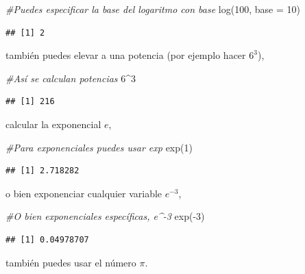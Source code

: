 \documentclass[]{tufte-book}
\newenvironment{Shaded}{}{}
\newcommand{\AttributeTok}[1]{\textcolor[rgb]{0.49,0.56,0.16}{#1}}
\newcommand{\CommentTok}[1]{\textcolor[rgb]{0.38,0.63,0.69}{\textit{#1}}}
\newcommand{\DecValTok}[1]{\textcolor[rgb]{0.25,0.63,0.44}{#1}}
\newcommand{\FunctionTok}[1]{\textcolor[rgb]{0.02,0.16,0.49}{#1}}
\newcommand{\NormalTok}[1]{#1}
\newcommand{\SpecialCharTok}[1]{\textcolor[rgb]{0.25,0.44,0.63}{#1}}
\begin{document}
\begin{Shaded}
\begin{Highlighting}[]
\CommentTok{\#Puedes especificar la base del logaritmo con base }
\FunctionTok{log}\NormalTok{(}\DecValTok{100}\NormalTok{, }\AttributeTok{base =} \DecValTok{10}\NormalTok{)}
\end{Highlighting}
\end{Shaded}

\begin{verbatim}
## [1] 2
\end{verbatim}

también puedes elevar a una potencia (por ejemplo hacer \(6^3\)),

\begin{Shaded}
\begin{Highlighting}[]
\CommentTok{\#Así se calculan potencias}
\DecValTok{6}\SpecialCharTok{\^{}}\DecValTok{3}
\end{Highlighting}
\end{Shaded}

\begin{verbatim}
## [1] 216
\end{verbatim}

calcular la exponencial \(e\),

\begin{Shaded}
\begin{Highlighting}[]
\CommentTok{\#Para exponenciales puedes usar exp}
\FunctionTok{exp}\NormalTok{(}\DecValTok{1}\NormalTok{)}
\end{Highlighting}
\end{Shaded}

\begin{verbatim}
## [1] 2.718282
\end{verbatim}

o bien exponenciar cualquier variable \(e^{-3}\),

\begin{Shaded}
\begin{Highlighting}[]
\CommentTok{\#O bien exponenciales específicas, e\^{}{-}3}
\FunctionTok{exp}\NormalTok{(}\SpecialCharTok{{-}}\DecValTok{3}\NormalTok{)}
\end{Highlighting}
\end{Shaded}

\begin{verbatim}
## [1] 0.04978707
\end{verbatim}

también puedes usar el número \(\pi\).
\end{document}
